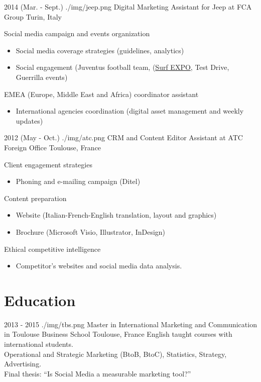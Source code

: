 \documentclass[]{cv}
\begin{document}
\begin{entrylistlogodated}
\entrylogodated
      {2014 \scriptsize{(Mar. - Sept.)}}
       {./img/jeep.png}
      {Digital Marketing Assistant for Jeep\textregistered{} at FCA Group}
      {Turin, Italy}
      {
        Social media campaign and events organization
        \begin{itemize}
        \item Social media coverage strategies (guidelines, analytics)
        \item Social engagement (Juventus football team, (\href{http://www.italiasurfexpo.it}{Surf EXPO}, Test Drive, Guerrilla events)
        \end{itemize}
        EMEA (Europe, Middle East and Africa) coordinator assistant
        \begin{itemize}
        \item International agencies coordination (digital asset management and weekly updates)
        \end{itemize}
      }
\end{entrylistlogodated}

\begin{entrylistlogodated}
\entrylogodated
      {2012 \scriptsize{(May - Oct.)}}
       {./img/atc.png}
      {CRM and Content Editor Assistant at ATC Foreign Office}
      {Toulouse, France}
      {
        Client engagement strategies
        \begin{itemize}
        \item Phoning and e-mailing campaign (Ditel)
        \end{itemize}

        Content preparation
        \begin{itemize}
        \item Website (Italian-French-English translation, layout and graphics)
        \item Brochure (Microsoft Visio, Illustrator, InDesign)
        \end{itemize}

        Ethical competitive intelligence
        \begin{itemize}
        \item Competitor's websites and social media data analysis.
        \end{itemize}
      }
\end{entrylistlogodated}

\framebreak

\section{Education}
\begin{entrylistlogodated}
\entrylogodated
    {2013 - 2015}
    {./img/tbs.png}
    {Master in International Marketing and Communication in Toulouse Business School}
    {Toulouse, France}
    {
      English taught courses with international students.\\
      Operational and Strategic Marketing (BtoB, BtoC), Statistics, Strategy, Advertising.\\
      Final thesis: ``Is Social Media a measurable marketing tool?''
    }
\end{entrylistlogodated}
\end{document}
